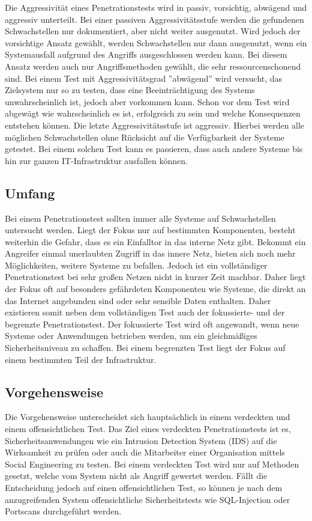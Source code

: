 Die Aggressivität eines Penetrationstests wird in passiv, vorsichtig, abwägend und aggressiv unterteilt. Bei
einer passiven Aggressivitätsstufe werden die gefundenen Schwachstellen nur dokumentiert, aber nicht weiter
ausgenutzt. Wird jedoch der vorsichtige Ansatz gewählt, werden Schwachstellen nur dann ausgenutzt, wenn ein
Systemausfall aufgrund des Angriffs ausgeschlossen werden kann. Bei diesem Ansatz werden auch nur Angriffsmethoden
gewählt, die sehr ressourcenschonend sind. Bei einem Test mit Aggressivitätsgrad ”abwägend”
wird versucht, das Zielsystem nur so zu testen, dass eine Beeinträchtigung des Systems unwahrscheinlich ist,
jedoch aber vorkommen kann. Schon vor dem Test wird abgewägt wie wahrscheinlich es ist, erfolgreich zu sein
und welche Konsequenzen entstehen können. Die letzte Aggressivitätsstufe ist aggressiv. Hierbei werden alle
möglichen Schwachstellen ohne Rücksicht auf die Verfügbarkeit der Systeme getestet. Bei einem solchen Test
kann es passieren, dass auch andere Systeme bis hin zur ganzen IT-Infrastruktur ausfallen können\cite[14]{pt03bsi}.

\subsection{Umfang}

Bei einem Penetrationstest sollten immer alle Systeme auf Schwachstellen untersucht werden. Liegt der Fokus
nur auf bestimmten Komponenten, besteht weiterhin die Gefahr, dass es ein Einfalltor in das interne Netz gibt.
Bekommt ein Angreifer einmal unerlaubten Zugriff in das innere Netz, bieten sich noch mehr Möglichkeiten,
weitere Systeme zu befallen. Jedoch ist ein vollständiger Penetrationstest bei sehr großen Netzen nicht in kurzer
Zeit machbar. Daher liegt der Fokus oft auf besonders gefährdeten Komponenten wie Systeme, die direkt an das
Internet angebunden sind oder sehr sensible Daten enthalten. Daher existieren somit neben dem vollständigen
Test auch der fokussierte- und der begrenzte Penetrationstest. Der fokussierte Test wird oft angewandt, wenn
neue Systeme oder Anwendungen betrieben werden, um ein gleichmäßiges Sicherheitsniveau zu schaffen. Bei
einem begrenzten Test liegt der Fokus auf einem bestimmten Teil der Infrastruktur\cite[14-15]{pt03bsi}.

\subsection{Vorgehensweise}
Die Vorgehensweise unterscheidet sich hauptsächlich in einem verdeckten und einem offensichtlichen Test.
Das Ziel eines verdeckten Penetrationstests ist es, Sicherheitsanwendungen wie ein Intrusion Detection System
(IDS) auf die Wirksamkeit zu prüfen oder auch die Mitarbeiter einer Organisation mittels Social Engineering zu
testen. Bei einem verdeckten Test wird nur auf Methoden gesetzt, welche vom System nicht als Angriff gewertet
werden. Fällt die Entscheidung jedoch auf einen offensichtlichen Test, so können je nach dem anzugreifenden
System offensichtliche Sicherheitstests wie SQL-Injection oder Portscans durchgeführt werden\cite[15]{pt03bsi}.

